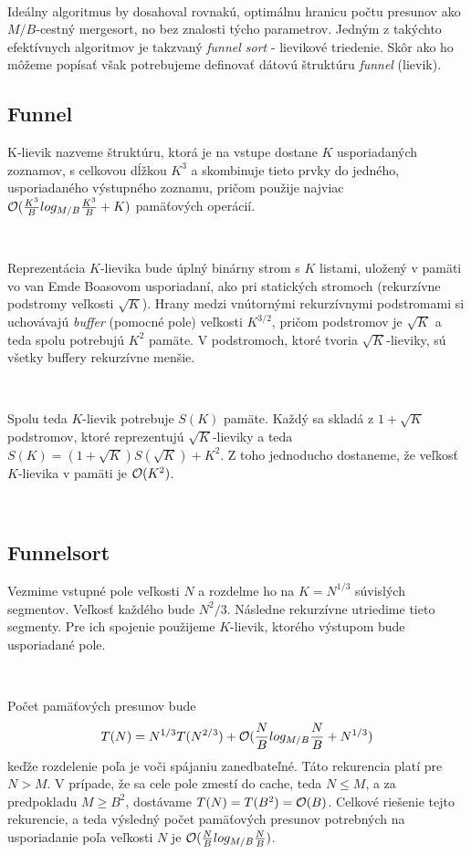 \

Ideálny \obliv algoritmus by dosahoval rovnakú, optimálnu hranicu počtu presunov ako $M/B$-cestný mergesort, no bez znalosti týcho parametrov. Jedným z takýchto efektívnych \obliv algoritmov je takzvaný {\em funnel sort} - lievikové triedenie. Skôr ako ho môžeme popísať však potrebujeme definovať dátovú štruktúru {\em funnel} (lievik).

\subsection{Funnel}

K-lievik nazveme štruktúru, ktorá je na vstupe dostane $K$ usporiadaných zoznamov, s celkovou dĺžkou $K^3$ a skombinuje tieto prvky do jedného, usporiadaného výstupného zoznamu, pričom použije najviac $\mathcal{O}(\frac{K^3}{B} log_{M/B} \frac{K^3}{B} + K)$ pamäťových operácií.

\

Reprezentácia $K$-lievika bude úplný binárny strom s $K$ listami, uložený v pamäti vo van Emde Boasovom usporiadaní, ako pri statických stromoch (rekurzívne podstromy veľkosti $\sqrt{K}$). Hrany medzi vnútornými rekurzívnymi podstromami si uchovávajú {\em buffer} (pomocné pole) veľkosti $K^{3/2}$, pričom podstromov je $\sqrt{K}$ a teda spolu potrebujú $K^2$ pamäte. V podstromoch, ktoré tvoria $\sqrt{K}$-lieviky, sú všetky buffery rekurzívne menšie.

\

Spolu teda $K$-lievik potrebuje $S(K)$ pamäte. Každý sa skladá z $1+\sqrt{K}$ podstromov, ktoré reprezentujú $\sqrt{K}$-lieviky a teda $S(K) = (1+\sqrt{K})S(\sqrt{K}) + K^2$. Z toho jednoducho dostaneme, že veľkosť $K$-lievika v pamäti je $\mathcal{O}(K^2)$.

\


\subsection{Funnelsort}

Vezmime vstupné pole veľkosti $N$ a rozdelme ho na $K = N^{1/3}$ súvislých segmentov. Veľkosť každého bude $N^2/3$. Následne rekurzívne utriedime tieto segmenty. Pre ich spojenie použijeme $K$-lievik, ktorého výstupom bude usporiadané pole.

\

Počet pamäťových presunov bude
\[
T(N) = N^{1/3}T(N^{2/3}) + \mathcal{O}(\frac{N}{B} log_{M/B} \frac{N}{B} + N^{1/3})
\]
keďže rozdelenie poľa je voči spájaniu zanedbateľné. Táto rekurencia platí pre $N > M$. V prípade, že sa cele pole zmestí do cache, teda $N \le M$, a za predpokladu $M \ge B^2$, dostávame $T(N) = T(B^2) = \mathcal{O}(B)$. Celkové riešenie tejto rekurencie, a teda výsledný počet pamäťových presunov potrebných na usporiadanie poľa veľkosti $N$ je $\mathcal{O}(\frac{N}{B} log_{M/B} \frac{N}{B})$.
